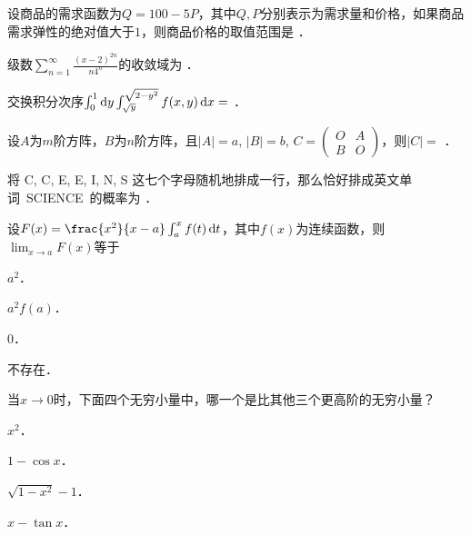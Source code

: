 \documentclass[plain,noanswer,medmath]{../../template/jnuexam}
\begin{document}




\begin{problem}
设商品的需求函数为$Q = 100 - 5P$，其中$Q,P$分别表示为需求量和价格，如果商品需求弹性的绝对值大于$1$，则商品价格的取值范围是 \fillin{}．
\end{problem}


\begin{problem}
级数$\sum_{n = 1}^{\infty}\frac{(x - 2)^{2n}}{n4^n}$的收敛域为 \fillin{}．
\end{problem}


\begin{problem}
交换积分次序$\int_0^1\mathop{}\!\mathrm{d} y \int_{\sqrt{y}}^{\sqrt{2 - y^2}} f(x,y)\mathop{}\!\mathrm{d} x =$ \fillin{}．
\end{problem}


\begin{problem}
设$A$为$m$阶方阵，$B$为$n$阶方阵，且$|A| = a$, $|B| = b$, $C = \begin{pmatrix}
  O & A \\
  B & O
\end{pmatrix}$，则$|C| =$ \fillin{}．
\end{problem}


\begin{problem}
将 C, C, E, E, I, N, S 这七个字母随机地排成一行，那么恰好排成英文单词~\hbox{SCIENCE}~的概率为 \fillin{}．
\end{problem}




\begin{problem}
设$F(x) = \frac{x^2}{x - a}\int_a^x f(t) \dt$，其中$f(x)$为连续函数，则$\lim_{x \to a} F(x)$等于\pickout{}
\begin{abcd}
\item $a^2$．        
\item $a^2 f(a)$．        
\item $0$．        
\item 不存在．
\end{abcd}
\end{problem}


\begin{problem}
当$x \to 0$时，下面四个无穷小量中，哪一个是比其他三个更高阶的无穷小量？\pickout{}
\begin{abcd}
\item $x^2$．     
\item $1 - \cos x$．     
\item $\sqrt{1 - x^2} - 1$．     
\item $x - \tan x$．
\end{abcd}
\end{problem}
\end{document}

